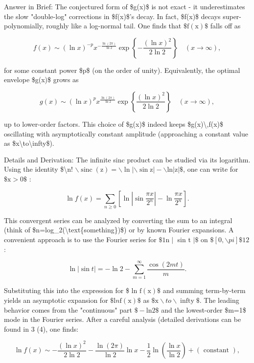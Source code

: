 \documentclass[10pt]{article}
\begin{document}
Answer in Brief: The conjectured form of \$g(x)\$ is not exact - it underestimates the slow "double-log" corrections in \$f(x)\$'s decay. In fact, \$f(x)\$ decays super-polynomially, roughly like a log-normal tail. One finds that $\$ \mathrm{f}(\mathrm{x}) \$$ falls off as

$$
f(x) \sim(\ln x)^{-p} x^{-\frac{\ln (2 \pi)}{\ln 2}} \exp \left\{-\frac{(\ln x)^{2}}{2 \ln 2}\right\} \quad(x \rightarrow \infty),
$$

for some constant power \$p\$ (on the order of unity). Equivalently, the optimal envelope \$g(x)\$ grows as

$$
g(x) \sim(\ln x)^{p} x^{\frac{\ln (2 \pi)}{\ln 2}} \exp \left\{\frac{(\ln x)^{2}}{2 \ln 2}\right\} \quad(x \rightarrow \infty),
$$

up to lower-order factors. This choice of \$g(x)\$ indeed keeps \$g(x)\textbackslash ,f(x)\$ oscillating with asymptotically constant amplitude (approaching a constant value as \$x\textbackslash to\textbackslash infty\$).

Details and Derivation: The infinite sinc product can be studied via its logarithm. Using the identity \$\textbackslash n! $\backslash \operatorname{sinc}(\mathrm{z})=\backslash \ln |\backslash \sin \mathrm{z}|-\backslash \mathrm{ln}|\mathrm{z}| \$$, one can write for $\$ \mathrm{x}>0 \$$ :

$$
\ln f(x)=\sum_{n \geq 0}\left[\ln \left|\sin \frac{\pi x}{2^{n}}\right|-\ln \frac{\pi x}{2^{n}}\right] .
$$

This convergent series can be analyzed by converting the sum to an integral (think of \$n=log\_2(\textbackslash text\{something\})\$) or by known Fourier expansions. A convenient approach is to use the Fourier series for $\$ 1 \mathrm{n} \mid$ sin t $\mid \$$ on $\$[0, \backslash p i] \$ 12$ :

$$
\ln |\sin t|=-\ln 2-\sum_{m=1}^{\infty} \frac{\cos (2 m t)}{m} .
$$

Substituting this into the expression for \$ ln $\mathrm{f}(\mathrm{x}) \$$ and summing term-by-term yields an asymptotic expansion for $\$ \mathrm{l} n \mathrm{f}(\mathrm{x}) \$$ as $\$ \mathrm{x} \backslash t o \backslash \operatorname{infty} \$$. The leading behavior comes from the "continuous" part $\$-\mathrm{ln} 2 \$$ and the lowest-order \$m=1\$ mode in the Fourier series. After a careful analysis (detailed derivations can be found in 3 (4), one finds:

$$
\ln f(x) \sim-\frac{(\ln x)^{2}}{2 \ln 2}-\frac{\ln (2 \pi)}{\ln 2} \ln x-\frac{1}{2} \ln \left(\frac{\ln x}{\ln 2}\right)+(\text { constant }),
$$
\end{document}
